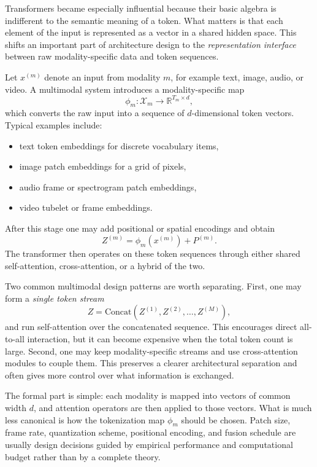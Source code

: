 Transformers became especially influential because their basic algebra is indifferent to the semantic meaning of a token.
What matters is that each element of the input is represented as a vector in a shared hidden space.
This shifts an important part of architecture design to the \emph{representation interface} between raw modality-specific data and token sequences.

Let \(x^{(m)}\) denote an input from modality \(m\), for example text, image, audio, or video.
A multimodal system introduces a modality-specific map
\[
\phi_m : \mathcal{X}_m \to \mathbb{R}^{T_m \times d},
\]
which converts the raw input into a sequence of \(d\)-dimensional token vectors.
Typical examples include:
\begin{itemize}
    \item text token embeddings for discrete vocabulary items,
    \item image patch embeddings for a grid of pixels,
    \item audio frame or spectrogram patch embeddings,
    \item video tubelet or frame embeddings.
\end{itemize}
After this stage one may add positional or spatial encodings and obtain
\[
Z^{(m)} = \phi_m(x^{(m)}) + P^{(m)}.
\]
The transformer then operates on these token sequences through either shared self-attention, cross-attention, or a hybrid of the two.

Two common multimodal design patterns are worth separating.
First, one may form a \emph{single token stream}
\[
Z = \mathrm{Concat}(Z^{(1)}, Z^{(2)}, \dots, Z^{(M)}),
\]
and run self-attention over the concatenated sequence.
This encourages direct all-to-all interaction, but it can become expensive when the total token count is large.
Second, one may keep modality-specific streams and use cross-attention modules to couple them.
This preserves a clearer architectural separation and often gives more control over what information is exchanged.

\begin{remark}
The formal part is simple: each modality is mapped into vectors of common width \(d\), and attention operators are then applied to those vectors.
What is much less canonical is how the tokenization map \(\phi_m\) should be chosen.
Patch size, frame rate, quantization scheme, positional encoding, and fusion schedule are usually design decisions guided by empirical performance and computational budget rather than by a complete theory.
\end{remark}

